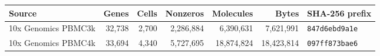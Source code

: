 \begin{tabular}{lrrrrrl}
\toprule
Source & Genes & Cells & Nonzeros & Molecules & Bytes & SHA-256 prefix\\
\midrule
10x Genomics PBMC3k & 32,738 & 2,700 & 2,286,884 & 6,390,631 & 7,621,991 & \texttt{847d6ebd9a1e}\\
10x Genomics PBMC4k & 33,694 & 4,340 & 5,727,695 & 18,874,824 & 18,423,814 & \texttt{097ff873bae6}\\
\bottomrule
\end{tabular}
